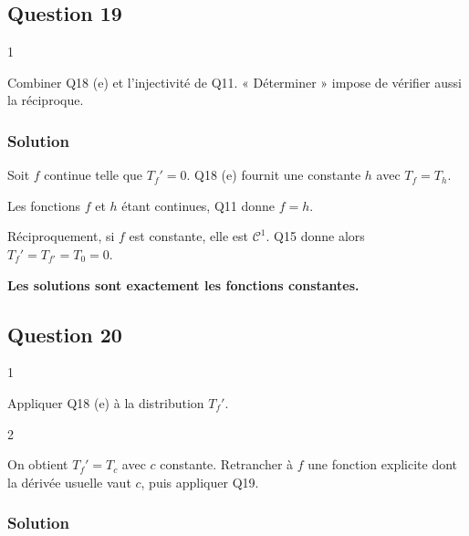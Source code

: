 \documentclass[11pt,a4paper]{article}
\begin{document}
\hypertarget{question-19}{%
\subsection{Question 19}\label{question-19}}

\begin{indication}{1}

Combiner Q18 (e) et l'injectivité de Q11. « Déterminer » impose de vérifier aussi la réciproque.

\end{indication}

\hypertarget{solution-18}{%
\subsubsection{Solution}\label{solution-18}}

Soit \(f\) continue telle que \(T_f'=0\). Q18 (e) fournit une constante \(h\) avec \(T_f=T_h\).

Les fonctions \(f\) et \(h\) étant continues, Q11 donne \(f=h\).

Réciproquement, si \(f\) est constante, elle est \(\mathcal C^1\). Q15 donne alors \(T_f'=T_{f'}=T_0=0\).

\textbf{Les solutions sont exactement les fonctions constantes.}

\hypertarget{question-20}{%
\subsection{Question 20}\label{question-20}}

\begin{indication}{1}

Appliquer Q18 (e) à la distribution \(T_f'\).

\end{indication}

\begin{indication}{2}

On obtient \(T_f'=T_c\) avec \(c\) constante. Retrancher à \(f\) une fonction explicite dont la dérivée usuelle vaut \(c\), puis appliquer Q19.

\end{indication}

\hypertarget{solution-19}{%
\subsubsection{Solution}\label{solution-19}}
\end{document}
